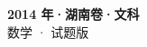 \documentclass[zihao=-4, a4paper]{ctexart}
\begin{document}
\begin{center}
  {\Large\bfseries 2014 年·湖南卷·文科}\\[4pt]
  {\large 数学 · 试题版}
\end{center}
\medskip
{}

\end{document}
